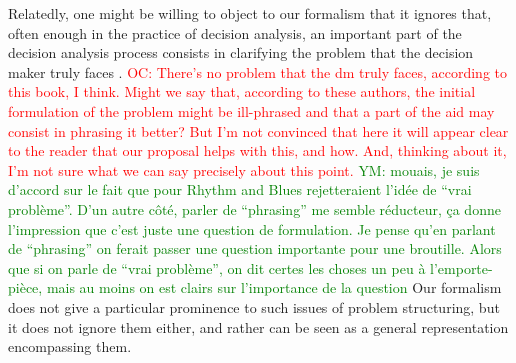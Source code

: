 \documentclass[preprint, french, english, 11pt, authoryear]{elsarticle}%
\newcommand{\commentYM}[1]{\textcolor{green}{YM: #1}}
\newcommand{\commentOC}[1]{\textcolor{red}{OC: #1}}
\begin{document}
Relatedly, one might be willing to object to our formalism that it ignores that, often enough in the practice of decision analysis, an important part of the decision analysis process consists in clarifying the problem that the decision maker truly faces \citep{bouyssou_evaluation_2000}. 
\commentOC{There’s no problem that the dm truly faces, according to this book, I think. Might we say that, according to these authors, the initial formulation of the problem might be ill-phrased and that a part of the aid may consist in phrasing it better? But I’m not convinced that here it will appear clear to the reader that our proposal helps with this, and how. And, thinking about it, I’m not sure what we can say precisely about this point.} \commentYM{mouais, je suis d'accord sur le fait que pour Rhythm and Blues rejetteraient l'idée de ``vrai problème''. D'un autre côté, parler de ``phrasing'' me semble réducteur, ça donne l'impression que c'est juste une question de formulation. Je pense qu'en parlant de ``phrasing'' on ferait passer une question importante pour une broutille. Alors que si on parle de ``vrai problème'', on dit certes les choses un peu à l'emporte-pièce, mais au moins on est clairs sur l'importance de la question} Our formalism does not give a particular prominence to such issues of problem structuring, but it does not ignore them either, and rather can be seen as a general representation encompassing them.
\end{document}
